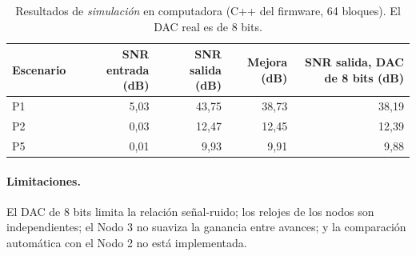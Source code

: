 \begin{table}[ht]
  \centering
  \caption{Resultados de \emph{simulaci\'on} en computadora (C++ del firmware, 64 bloques). El DAC real es de 8 bits.}
  \begin{tabular}{lrrrr}
    \toprule
    Escenario & SNR entrada (dB) & SNR salida (dB) & Mejora (dB) & SNR salida, DAC de 8 bits (dB) \\
    \midrule
    P1 & 5,03 & 43,75 & 38,73 & 38,19 \\
    P2 & 0,03 & 12,47 & 12,45 & 12,39 \\
    P5 & 0,01 &  9,93 &  9,91 &  9,88 \\
    \bottomrule
  \end{tabular}
\end{table}

\paragraph{Limitaciones.}
El DAC de 8 bits limita la relaci\'on se\~nal-ruido; los relojes de los nodos son independientes; el Nodo 3 no suaviza la ganancia
entre avances; y la comparaci\'on autom\'atica con el Nodo 2 no est\'a implementada.
